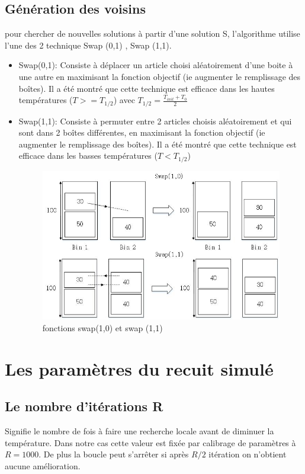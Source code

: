 \documentclass[12pt]{article}
\begin{document}
\subsection{Génération des voisins}
pour chercher de nouvelles solutions à partir d’une solution S, l’algorithme utilise l’une des 2 technique Swap (0,1) , Swap (1,1). 
\begin{itemize}
    \item Swap(0,1): Consiste à déplacer un article choisi aléatoirement d’une boite à une autre 
    en maximisant la fonction objectif (ie augmenter le remplissage des boîtes). 
    Il a été montré que cette technique est efficace dans les hautes températures ($T>=T_{1/2}$) avec $ T_{1/2} = \frac{T_{init}+T_{0}}{2}$ 
    \item Swap(1,1): Consiste à permuter entre 2 articles choisis aléatoirement et qui sont dans 2 boîtes différentes, en maximisant la fonction objectif (ie augmenter le remplissage des boîtes).
     Il a été montré que cette technique est efficace dans les basses températures ($T<T_{1/2}$)
\begin{figure}[H]
    \includegraphics[width=\linewidth]{../figures/RS_SWAP.png}
    \caption{fonctions swap(1,0) et swap (1,1)}
    \label{fig:swap}
\end{figure}
\end{itemize}
\section{Les paramètres du recuit simulé }
\subsection{Le nombre d'itérations R}
Signifie le nombre de fois à faire une recherche locale avant de diminuer la température. Dans notre cas cette valeur est fixée par calibrage de paramètres à $R = 1000$.
 De plus la boucle peut s’arrêter si après $R/2$ itération on n'obtient aucune amélioration.
\end{document}
